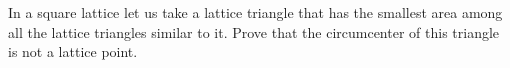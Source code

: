 In a square lattice let us take a lattice triangle that has the smallest area among all the lattice triangles similar to it. Prove that the circumcenter of this triangle is not a lattice point.